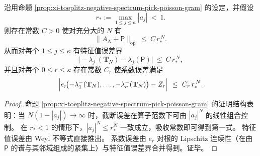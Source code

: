 \begin{proposition}\label{prop:xi-toeplitz-negative-spectrum-exponential-rate}
沿用命题 \ref{prop:xi-toeplitz-negative-spectrum-pick-poisson-gram} 的设定，并假设
\[
r_\ast:=\max_{1\le j\le\kappa}|a_j|\ <\ 1.
\]
则存在常数 \(C>0\) 使对充分大的 \(N\) 有
\[
\boxed{\;\|A_N+\mathsf P\|_{\mathrm{op}}\ \le\ C\,r_\ast^{\,N}.\;}
\]
从而对每个 \(1\le j\le \kappa\) 有特征值误差界
\[
\bigl|-\lambda_j^-(\mathbf{T}_N)-\lambda_j(\mathsf P)\bigr|\ \le\ C\,r_\ast^{\,N},
\]
并且对每个 \(0\le r\le\kappa\) 存在常数 \(C_r\) 使系数误差满足
\[
\Bigl|e_r\!\bigl(-\lambda_1^-(\mathbf{T}_N),\dots,-\lambda_\kappa^-(\mathbf{T}_N)\bigr)-Z_r\Bigr|
\ \le\ C_r\,r_\ast^{\,N}.
\]
\end{proposition}
\begin{proof}
命题 \ref{prop:xi-toeplitz-negative-spectrum-pick-poisson-gram} 的证明结构表明：当 \(N(1-|a_j|)\to\infty\) 时，截断误差在算子范数下可由 \(|a_j|^N\) 的线性组合控制。
在 \(r_\ast<1\) 的情形下，\(|a_j|^N\le r_\ast^N\) 一致成立，吸收常数即可得到第一式。
特征值误差由 Weyl 不等式直接推出。
系数误差由 \(e_r\) 对根的 Lipschitz 连续性（在由 \(\mathsf P\) 的谱与其邻域组成的紧集上）与特征值误差界合并得到。证毕。
\end{proof}

